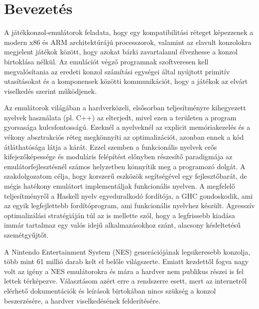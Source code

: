 \chapter{Bevezetés} %
\label{ch:intro}


A játékkonzol-emulátorok feladata, hogy egy kompatibilitási réteget képezzenek a modern x86 és ARM architektúrájú processzorok, valamint az elavult konzolokra megjelent játékok között, hogy azokat bárki zavartalanul élvezhesse a konzol birtoklása nélkül. Az emulációt végző programnak szoftveresen kell megvalósítania az eredeti konzol számítási egységei által nyújtott primitív utasításokat és a komponensek közötti kommunikációt, hogy a játékok az elvárt viselkedés szerint működjenek.

Az emulátorok világában a hardverközeli, elsősorban teljesítményre kihegyezett nyelvek használata (pl. C++) az elterjedt, mivel ezen a területen a program gyorsasága kulcsfontosságú. Ezeknél a nyelveknél az explicit memóriakezelés és a vékony absztrakciós réteg megkönnyíti az optimalizációt, azonban ennek a kód átláthatósága látja a kárát.
Ezzel szemben a funkcionális nyelvek erős kifejezőképessége és moduláris felépítést előnyben részesítő paradigmája az emulátorfejlesztésnél számos helyzetben könnyítik meg a programozó dolgát. A szakdolgozatom célja, hogy korszerű eszközök segítségével
egy fejlesztőbarát, de mégis hatékony emulátort implementáljak funkcionális nyelven. A megfelelő teljesítményről a Haskell nyelv egyeduralkodó fordítója, a GHC gondoskodik, ami az egyik legfejlettebb fordítóprogram, ami funkcionális nyelvhez készült. Agresszív optimalizálási stratégiáján túl az is mellette szól, hogy a legfrissebb kiadása immár tartalmaz egy valós idejű alkalmazásokhoz szánt, alacsony késleltetésű szemétgyűjtőt. 

A Nintendo Entertainment System (NES) generációjának legsikeresebb konzolja\cite{thirdgen}, több mint 61 millió darab kelt el belőle világszerte. Emiatt kezdettől fogva nagy volt az igény a NES emulátorokra és mára a hardver nem publikus részei is fel lettek térképezve. Választásom azért erre a rendszerre esett, mert az internetről elérhető dokumentációk és leírások birtokában nincs szükség a konzol beszerzésére, a hardver viselkedésének felderítésére.